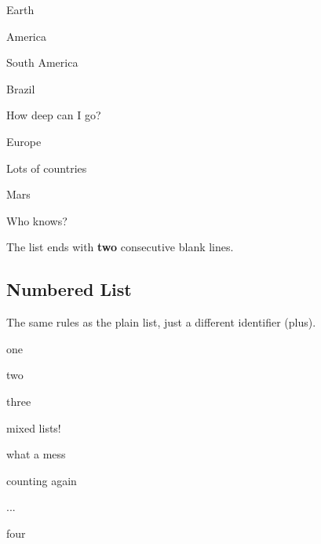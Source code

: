 \documentclass{article}
\begin{document}
\begin{compactitem}
\item Earth
  \begin{compactitem}
  \item America
    \begin{compactitem}
    \item South America
      \begin{compactitem}
      \item Brazil
      \item How deep can I go?
      \end{compactitem}
    \end{compactitem}
  \item Europe
    \begin{compactitem}
    \item Lots of countries
    \end{compactitem}
  \end{compactitem}
\item Mars
  \begin{compactitem}
  \item Who knows?
  \end{compactitem}
\end{compactitem}

The list ends with \textbf{two} consecutive blank lines.

\subsection*{Numbered List}

The same rules as the plain list, just a different
identifier (plus).

\begin{compactenum}
\item one
\item two
\item three
  \begin{compactitem}
  \item mixed lists!
  \item what a mess
    \begin{compactenum}
    \item counting again
    \item ...
    \end{compactenum}
  \end{compactitem}
\item four
\end{compactenum}
\end{document}
